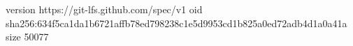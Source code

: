 version https://git-lfs.github.com/spec/v1
oid sha256:634f5ca1da1b6721affb78ed798238c1e5d9953cd1b825a0ed72adb4d1a0a41a
size 50077
